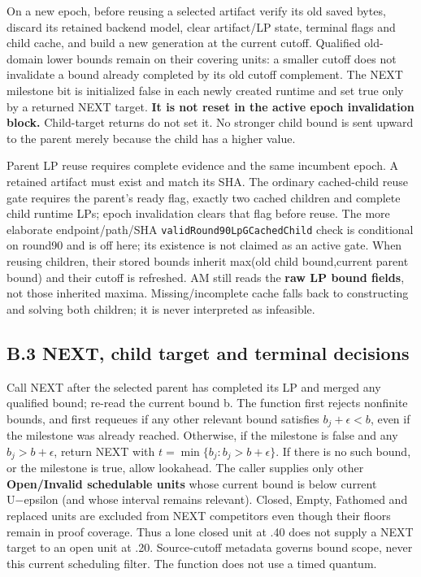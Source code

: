 \documentclass[
  american,
  11pt,
]{article}
\begin{document}
On a new epoch, before reusing a selected artifact verify its old saved
bytes, discard its retained backend model, clear artifact/LP state,
terminal flags and child cache, and build a new generation at the
current cutoff. Qualified old-domain lower bounds remain on their
covering units: a smaller cutoff does not invalidate a bound already
completed by its old cutoff complement. The NEXT milestone bit is
initialized false in each newly created runtime and set true only by a
returned NEXT target. \textbf{It is not reset in the active epoch
invalidation block.} Child-target returns do not set it. No stronger
child bound is sent upward to the parent merely because the child has a
higher value.

Parent LP reuse requires complete evidence and the same incumbent epoch.
A retained artifact must exist and match its SHA. The ordinary
cached-child reuse gate requires the parent's ready flag, exactly two
cached children and complete child runtime LPs; epoch invalidation
clears that flag before reuse. The more elaborate endpoint/path/SHA
\texttt{validRound90LpGCachedChild} check is
conditional on round90 and is off here; its existence is not claimed as
an active gate. When reusing children, their stored bounds inherit
max(old child bound,current parent bound) and their cutoff is refreshed.
AM still reads the \textbf{raw LP bound fields}, not those inherited
maxima. Missing/incomplete cache falls back to constructing and solving
both children; it is never interpreted as infeasible.

\subsection{B.3 NEXT, child target and terminal
decisions}\label{b.3-next-child-target-and-terminal-decisions}

Call NEXT after the selected parent has completed its LP and merged any
qualified bound; re-read the current bound b. The function first rejects
nonfinite bounds, and first requeues if any other relevant bound
satisfies \(b_j+\epsilon<b\), even if the milestone was already reached.
Otherwise, if the milestone is false and any \(b_j>b+\epsilon\), return
NEXT with \(t=\min\{b_j:b_j>b+\epsilon\}\). If there is no such bound,
or the milestone is true, allow lookahead. The caller supplies only
other \textbf{Open/Invalid schedulable units} whose current bound is
below current U−epsilon (and whose interval remains relevant). Closed,
Empty, Fathomed and replaced units are excluded from NEXT competitors
even though their floors remain in proof coverage. Thus a lone closed
unit at .40 does not supply a NEXT target to an open unit at .20.
Source-cutoff metadata governs bound scope, never this current
scheduling filter. The function does not use a timed quantum.
\end{document}
